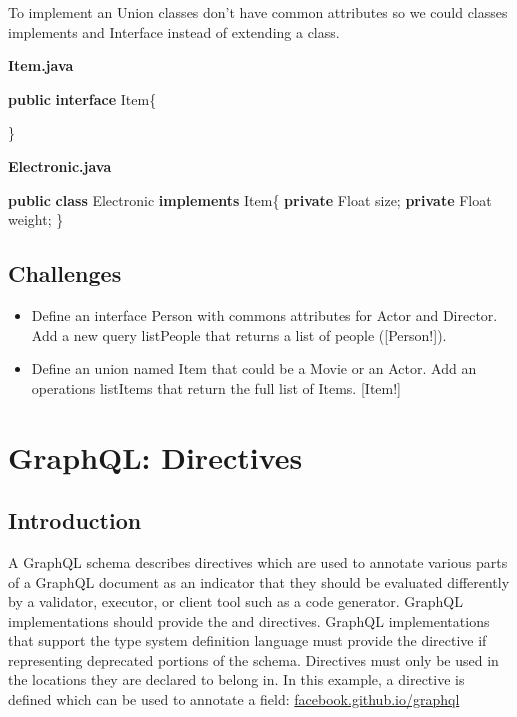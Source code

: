 \documentclass[]{book}
\newenvironment{Shaded}{\begin{snugshade}}{\end{snugshade}}
\newcommand{\KeywordTok}[1]{\textcolor[rgb]{0.13,0.29,0.53}{\textbf{#1}}}
\newcommand{\BuiltInTok}[1]{#1}
\newcommand{\NormalTok}[1]{#1}
\providecommand{\tightlist}{%
  \setlength{\itemsep}{0pt}\setlength{\parskip}{0pt}}
\begin{document}
To implement an Union classes don't have common attributes so we could
classes implements and Interface instead of extending a class.

\textbf{Item.java}

\begin{Shaded}
\begin{Highlighting}[]
\KeywordTok{public} \KeywordTok{interface}\NormalTok{ Item\{}
    
\NormalTok{\}}
\end{Highlighting}
\end{Shaded}

\textbf{Electronic.java}

\begin{Shaded}
\begin{Highlighting}[]
\KeywordTok{public} \KeywordTok{class}\NormalTok{ Electronic }\KeywordTok{implements}\NormalTok{ Item\{}
    \KeywordTok{private} \BuiltInTok{Float}\NormalTok{ size;}
    \KeywordTok{private} \BuiltInTok{Float}\NormalTok{ weight;}
\NormalTok{\}}
\end{Highlighting}
\end{Shaded}

\section{Challenges}\label{challenges-3}

\begin{itemize}
\tightlist
\item
  Define an interface Person with commons attributes for Actor and
  Director. Add a new query listPeople that returns a list of people
  ({[}Person!{]}).
\item
  Define an union named Item that could be a Movie or an Actor. Add an
  operations listItems that return the full list of Items. {[}Item!{]}
\end{itemize}

\chapter{GraphQL: Directives}\label{graphql-directives}

\section{Introduction}\label{introduction-4}

A GraphQL schema describes directives which are used to annotate various
parts of a GraphQL document as an indicator that they should be
evaluated differently by a validator, executor, or client tool such as a
code generator. GraphQL implementations should provide the \citet{skip}
and \citet{include} directives. GraphQL implementations that support the
type system definition language must provide the \citet{deprecated}
directive if representing deprecated portions of the schema. Directives
must only be used in the locations they are declared to belong in. In
this example, a directive is defined which can be used to annotate a
field:
\href{https://facebook.github.io/graphql/draft/\#sec-Type-System.Directives}{facebook.github.io/graphql}
\end{document}
